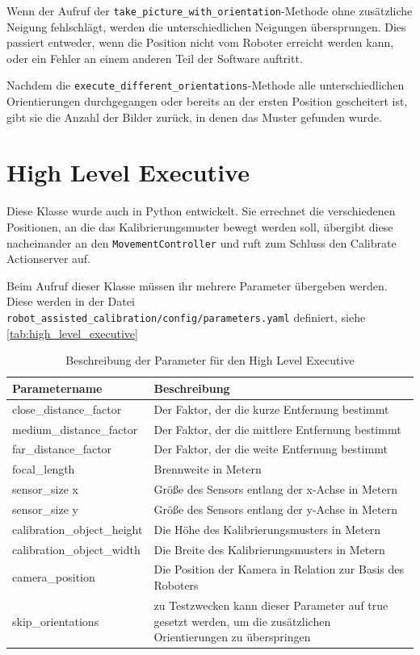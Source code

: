 Wenn der Aufruf der \texttt{take\_picture\_with\_orientation}-Methode ohne zusätzliche Neigung fehlschlägt, werden die unterschiedlichen Neigungen übersprungen. Dies passiert entweder, wenn die Position nicht vom Roboter erreicht werden kann, oder ein Fehler an einem anderen Teil der Software auftritt.

Nachdem die \texttt{execute\_different\_orientations}-Methode alle unterschiedlichen Orientierungen durchgegangen oder bereits an der ersten Position gescheitert ist, gibt sie die Anzahl der Bilder zurück, in denen das Muster gefunden wurde.

\section{High Level Executive} %
\label{sec:calibrationcontroller_impl}
Diese Klasse wurde auch in Python entwickelt. Sie errechnet die verschiedenen Positionen, an die das Kalibrierungsmuster bewegt werden soll, übergibt diese nacheinander an den \texttt{MovementController} und ruft zum Schluss den Calibrate Actionserver auf.

Beim Aufruf dieser Klasse müssen ihr mehrere Parameter übergeben werden. Diese werden in der Datei \texttt{robot\_assisted\_calibration/config/parameters.yaml} definiert, siehe \autoref{tab:high_level_executive}

\begin{table}
\begin{tabularx}{\textwidth}{|l|X|}
	\hline
	Parametername & Beschreibung \\\hline
	close\_distance\_factor & Der Faktor, der die kurze Entfernung bestimmt \\\hline
	medium\_distance\_factor & Der Faktor, der die mittlere Entfernung bestimmt \\\hline
	far\_distance\_factor & Der Faktor, der die weite Entfernung bestimmt \\\hline
	focal\_length & Brennweite in Metern \\\hline
	sensor\_size x & Größe des Sensors entlang der x-Achse in Metern \\\hline
	sensor\_size y & Größe des Sensors entlang der y-Achse in Metern \\\hline
	calibration\_object\_height & Die Höhe des Kalibrierungsmusters in Metern \\\hline
	calibration\_object\_width & Die Breite des Kalibrierungsmusters in Metern \\\hline
	camera\_position & Die Position der Kamera in Relation zur Basis des Roboters \\\hline
	skip\_orientations & zu Testzwecken kann dieser Parameter auf true gesetzt werden, um die zusätzlichen Orientierungen zu überspringen \\\hline
\end{tabularx}
\caption{Beschreibung der Parameter für den High Level Executive}
\label{tab:high_level_executive}
\end{table}

